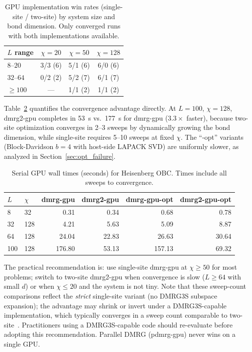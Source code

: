 \documentclass[preprint,12pt]{elsarticle}
\begin{document}
\begin{table}[h]
\centering
\caption{GPU implementation win rates (single-site / two-site) by system size and bond dimension.  Only converged runs with both implementations available.}
\label{tab:gpu_wins}
\begin{tabular}{lccc}
\toprule
$L$ range & $\chi = 20$ & $\chi = 50$ & $\chi = 128$ \\
\midrule
$8$--$20$   & 3/3 (6)  & 5/1 (6)  & 6/0 (6) \\
$32$--$64$  & 0/2 (2)  & 5/2 (7)  & 6/1 (7) \\
$\geq 100$  & ---      & 1/1 (2)  & 1/1 (2) \\
\bottomrule
\end{tabular}
\end{table}

Table~\ref{tab:serial_gpu} quantifies the convergence advantage directly.
At $L = 100$, $\chi = 128$, dmrg2-gpu completes in 53~s vs.\ 177~s for dmrg-gpu ($3.3\times$ faster), because two-site optimization converges in 2--3 sweeps by dynamically growing the bond dimension, while single-site requires 5--10 sweeps at fixed $\chi$.
The ``-opt'' variants (Block-Davidson $b{=}4$ with host-side LAPACK SVD) are uniformly slower, as analyzed in Section~\ref{sec:opt_failure}.

\begin{table}[h]
\centering
\caption{Serial GPU wall times (seconds) for Heisenberg OBC. Times include all sweeps to convergence.}
\label{tab:serial_gpu}
\begin{tabular}{llrrrr}
\toprule
$L$ & $\chi$ & dmrg-gpu & dmrg2-gpu & dmrg-gpu-opt & dmrg2-gpu-opt \\
\midrule
8   & 32  & 0.31 & 0.34 & 0.68 & 0.78 \\
32  & 128 & 4.21 & 5.63 & 5.09 & 8.87 \\
64  & 128 & 24.04 & 22.83 & 26.63 & 30.64 \\
100 & 128 & 176.80 & 53.13 & 157.13 & 69.32 \\
\bottomrule
\end{tabular}
\end{table}

The practical recommendation is: use single-site dmrg-gpu at $\chi \geq 50$ for most problems; switch to two-site dmrg2-gpu when convergence is slow ($L \geq 64$ with small $d$) or when $\chi \leq 20$ and the system is not tiny.
Note that these sweep-count comparisons reflect the \emph{strict} single-site variant (no DMRG3S subspace expansion); the advantage may shrink or invert under a DMRG3S-capable implementation, which typically converges in a sweep count comparable to two-site~\cite{Hubig2015}.
Practitioners using a DMRG3S-capable code should re-evaluate before adopting this recommendation.
Parallel DMRG (pdmrg-gpu) never wins on a single GPU.
\end{document}
